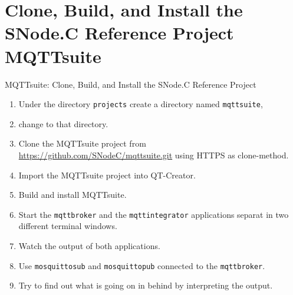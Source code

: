\nosectionpage
\section{Clone, Build, and Install the SNode.C Reference Project MQTTsuite}
\withsectionpage

\begin{frame}{\alert{MQTTsuite}: Clone, Build, and Install the SNode.C Reference Project}
  \begin{enumerate}
    \item Under the directory \lstinline|projects| create a directory named \lstinline|mqttsuite|,
    \item change to that directory.
    \item Clone the MQTTsuite project from \alert{\href{https://github.com/SNodeC/mqttsuite.git}{https://github.com/SNodeC/mqttsuite.git}} using \alert{HTTPS} as clone-method.
    \item Import the MQTTsuite project into QT-Creator.
    \item Build and install MQTTsuite.
    \item Start the \texttt{\alert{mqttbroker}} and the \texttt{\alert{mqttintegrator}} applications separat in two different terminal windows.
    \item Watch the output of both applications.
    \item Use \texttt{\alert{mosquitto\textunderscore{}sub}} and  \texttt{\alert{mosquitto\textunderscore{}pub}} connected to the \texttt{\alert{mqttbroker}}.
    \item Try to find out what is going on in behind by interpreting the output.
  \end{enumerate}
\end{frame}
